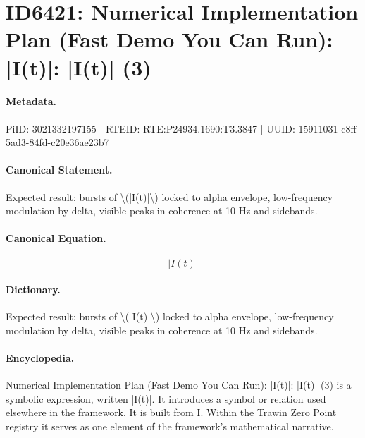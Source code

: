 \section*{ID6421: Numerical Implementation Plan (Fast Demo You Can Run): |I(t)|: |I(t)| (3)}
\paragraph{Metadata.}
PiID: 3021332197155 | RTEID: RTE:P24934.1690:T3.3847 | UUID: 15911031-c8ff-5ad3-84fd-c20e36ae23b7

\paragraph{Canonical Statement.}
Expected result: bursts of \textbackslash{}(|I(t)|\textbackslash{}) locked to alpha envelope, low-frequency modulation by delta, visible peaks in coherence at 10 Hz and sidebands.

\paragraph{Canonical Equation.}
\[
|I(t)|
\]

\paragraph{Dictionary.}
Expected result: bursts of \textbackslash{}( I(t) \textbackslash{}) locked to alpha envelope, low-frequency modulation by delta, visible peaks in coherence at 10 Hz and sidebands.

\paragraph{Encyclopedia.}
Numerical Implementation Plan (Fast Demo You Can Run): |I(t)|: |I(t)| (3) is a symbolic expression, written |I(t)|. It introduces a symbol or relation used elsewhere in the framework. It is built from I. Within the Trawin Zero Point registry it serves as one element of the framework's mathematical narrative.
